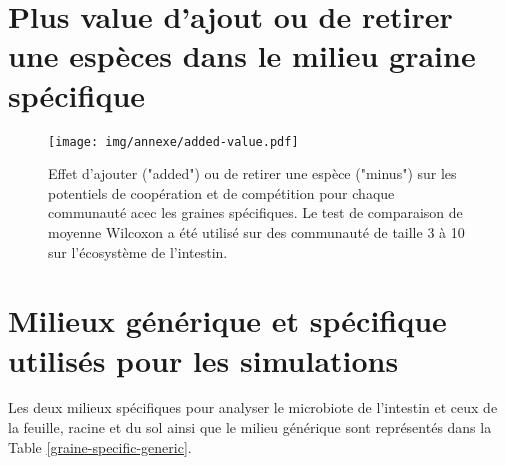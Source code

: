 \documentclass[../main.tex]{subfiles}
\begin{document}
\section*{Plus value d'ajout ou de retirer une espèces dans le milieu graine spécifique}
\begin{figure}[H]
    \centering
    \texttt{[image: img/annexe/added-value.pdf]}
    \caption{Effet d'ajouter ("added") ou de retirer une espèce ("minus") sur les potentiels de coopération et de compétition pour chaque communauté acec les graines spécifiques. Le test de comparaison de moyenne Wilcoxon a été utilisé sur des communauté de taille 3 à 10 sur l'écosystème de l'intestin.}
    \label{fig:added-value}
\end{figure}


\section{Milieux générique et spécifique utilisés pour les simulations}
Les deux milieux spécifiques pour analyser le microbiote de l'intestin et ceux de la feuille, racine et du sol ainsi que le milieu générique sont représentés dans la Table \ref{graine-specific-generic}.

\newpage
\end{document}
